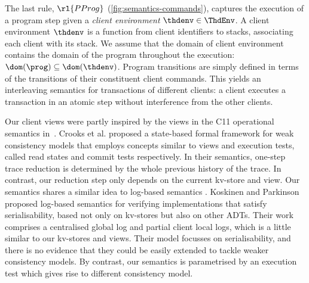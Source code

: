 The last rule, \( \rl{PProg} \) (\cref{fig:semantics-commands}),
captures the execution of a program step 
given a \emph{client environment} \(\thdenv \in \ThdEnv\).
A client environment \(\thdenv\) is a function from client identifiers to stacks, associating each client with its stack. 
We assume that the domain of client environment contains 
the domain of the program throughout the execution: 
\(\dom(\prog) \subseteq \dom(\thdenv)\).
Program transitions are simply defined in terms of the transitions of
their constituent client commands. 
This yields an interleaving semantics for transactions of different clients:  
a client executes a transaction in an atomic step without
interference from the  other clients. 

 Our client views were partly inspired by
the views in the C11 operational semantics in~\cite{promises}.
Crooks et al. \citet{seebelieve} proposed
a state-based formal framework for weak consistency models 
that employs concepts  similar to views and execution tests, called
read states and commit tests  respectively.
In their semantics, one-step trace reduction is determined by the whole previous history of the trace. 
In contrast, our reduction step only depends on the current
kv-store and view.
Our semantics shares a similar idea to log-based semantics \cite{push-pull,log-based-op}.
Koskinen and Parkinson
\citet{push-pull}  proposed log-based semantics for 
verifying implementations that satisfy serialisability, based not
only on kv-stores
but  also on other ADTs. Their work comprises a centralised global log 
and partial client local logs, which is a little similar to 
our kv-stores and views. Their model focusses on serialisability, and 
there is no evidence that they could be easily extended to tackle
weaker consistency models.
By contrast, our semantics is parametrised by an execution test which gives rise to 
different consistency model.
